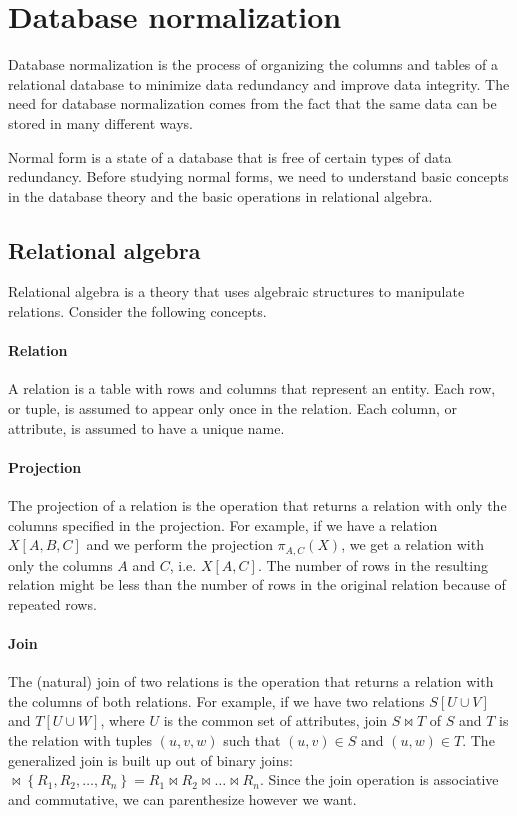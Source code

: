 \section{Database normalization}
\label{sec:normalization}

Database normalization is the process of organizing the columns and tables of a relational
database to minimize data redundancy and improve data integrity.  The need for database
normalization comes from the fact that the same data can be stored in many different ways.

Normal form is a state of a database that is free of certain types of data redundancy.
Before studying normal forms, we need to understand basic concepts in the database theory
and the basic operations in relational algebra.

\subsection{Relational algebra}

Relational algebra is a theory that uses algebraic structures to manipulate relations.
Consider the following concepts.

\paragraph{Relation}  A relation is a table with rows and columns that represent
an entity.  Each row, or tuple, is assumed to appear only once in the relation.  Each
column, or attribute, is assumed to have a unique name.

\paragraph{Projection}  The projection of a relation is the operation that returns a
relation with only the columns specified in the projection.  For example, if we have a
relation $X[A, B, C]$ and we perform the projection $\pi_{A, C}(X)$, we get a
relation with only the columns $A$ and $C$, i.e. $X[A, C]$.  The number of rows
in the resulting relation might be less than the number of rows in the original relation
because of repeated rows.

\paragraph{Join}  The (natural) join of two relations is the operation that returns a
relation with the columns of both relations.  For example, if we have two relations $S[U
\cup V]$ and $T[U \cup W]$, where $U$ is the common set of attributes, join $S \bowtie T$
of $S$ and $T$ is the relation with tuples $(u, v, w)$ such that $(u, v) \in S$ and $(u,
w) \in T$.  The generalized join is built up out of binary joins:  $\bowtie \left\{ R_1,
R_2, \dots, R_n \right\} = R_1 \bowtie R_2 \bowtie \dots \bowtie R_n$. Since the join
operation is associative and commutative, we can parenthesize however we want.

